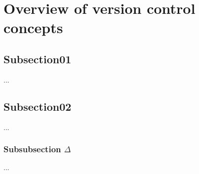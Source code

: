\section{Overview of version control concepts}
    \subsection{Subsection01}
    ...

    \subsection{Subsection02}
    ...

    \subsubsection{Subsubsection $\Delta$}
    ...
